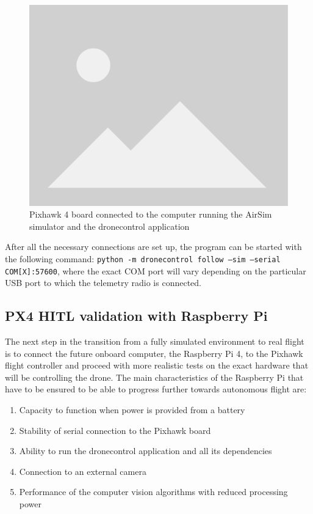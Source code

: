 \begin{figure}
  \centering
  \includegraphics[width=.6\textwidth, keepaspectratio]{img/placeholder.png}
  \caption{Pixhawk 4 board connected to the computer running the AirSim simulator and the dronecontrol application}
  \label{fig:hitl-setup-picture}
\end{figure}

After all the necessary connections are set up, the program can be started with the following command:
\texttt{python -m dronecontrol follow --sim --serial COM[X]:57600}, 
where the exact COM port will vary depending on the particular USB port to which the telemetry radio is connected.


\subsection{PX4 HITL validation with Raspberry Pi}
\label{sec:test-5-rpi}


The next step in the transition from a fully simulated environment to real flight is to connect the future onboard computer, the Raspberry Pi 4, to the Pixhawk flight controller and proceed with more realistic tests on the exact hardware that will be controlling the drone.
The main characteristics of the Raspberry Pi that have to be ensured to be able to progress further towards autonomous flight are:
\begin{enumerate}
    \item Capacity to function when power is provided from a battery
    \item Stability of serial connection to the Pixhawk board
    \item Ability to run the dronecontrol application and all its dependencies
    \item Connection to an external camera
    \item Performance of the computer vision algorithms with reduced processing power
\end{enumerate}

